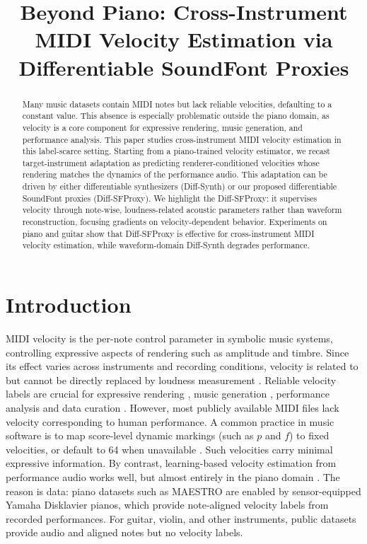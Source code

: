 \documentclass{article}
\title{Beyond Piano: Cross-Instrument MIDI Velocity Estimation via Differentiable SoundFont Proxies}
\begin{document}
\maketitle
\ifdefined\linenumbers\linenumbers\fi

\begin{abstract}
Many music datasets contain MIDI notes but lack reliable velocities, defaulting to a constant value. This absence is especially problematic outside the piano domain, as velocity is a core component for expressive rendering, music generation, and performance analysis. This paper studies cross-instrument MIDI velocity estimation in this label-scarce setting. Starting from a piano-trained velocity estimator, we recast target-instrument adaptation as predicting renderer-conditioned velocities whose rendering matches the dynamics of the performance audio. This adaptation can be driven by either differentiable synthesizers (Diff-Synth) or our proposed differentiable SoundFont proxies (Diff-SFProxy). We highlight the Diff-SFProxy: it supervises velocity through note-wise, loudness-related acoustic parameters rather than waveform reconstruction, focusing gradients on velocity-dependent behavior. Experiments on piano and guitar show that Diff-SFProxy is effective for cross-instrument MIDI velocity estimation, while waveform-domain Diff-Synth degrades performance.
\end{abstract}




\section{Introduction}
MIDI velocity is the per-note control parameter in symbolic music systems, controlling expressive aspects of rendering such as amplitude and timbre. Since its effect varies across instruments and recording conditions, velocity is related to but cannot be directly replaced by loudness measurement \cite{dan2006psy,jeong2018timbre}. Reliable velocity labels are crucial for expressive rendering \cite{rhyu2022sketching, zhang2024dexter}, music generation \cite{tang2025integrated, borovik2025symupe}, performance analysis \cite{morsi2025enable_rach3} and data curation \cite{zhang2022atepp}. However, most publicly available MIDI files lack velocity corresponding to human performance. A common practice in music software is to map score-level dynamic markings (such as $p$ and $f$) to fixed velocities, or default to 64 when unavailable \cite{dan2006psy}. Such velocities carry minimal expressive information. By contrast, learning-based velocity estimation from performance audio works well, but almost entirely in the piano domain \cite{jeong2018timbre, simonetta2022acoustics, kim2024method, he2026score}. The reason is data: piano datasets such as MAESTRO \cite{hawthorne2019maestro} are enabled by sensor-equipped Yamaha Disklavier pianos, which provide note-aligned velocity labels from recorded performances. For guitar, violin, and other instruments, public datasets \cite{tamer2023violin,riley2024gaps,riley2024high} provide audio and aligned notes but no velocity labels.
\end{document}
